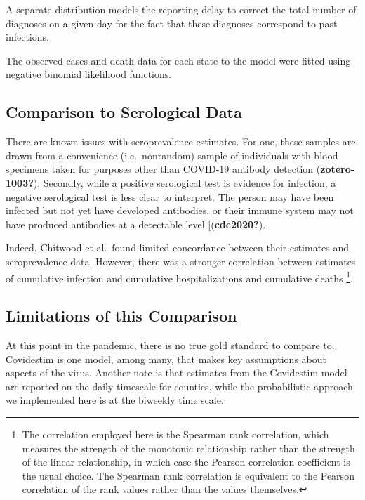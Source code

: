 \documentclass[12pt,twoside]{smiththesis}
\begin{document}
A separate distribution models the reporting delay to correct the total number of diagnoses on a given day for the fact that these diagnoses correspond to past infections.

The observed cases and death data for each state to the model were fitted using negative binomial likelihood functions.

\hypertarget{comparison-to-serological-data}{%
\subsection{Comparison to Serological Data}\label{comparison-to-serological-data}}

There are known issues with seroprevalence estimates. For one, these samples are drawn from a convenience (i.e.~nonrandom) sample of individuals with blood specimens taken for purposes other than COVID-19 antibody detection (\textbf{zotero-1003?}). Secondly, while a positive serological test is evidence for infection, a negative serological test is less clear to interpret. The person may have been infected but not yet have developed antibodies, or their immune system may not have produced antibodies at a detectable level {[}(\textbf{cdc2020?}).

Indeed, Chitwood et al.~found limited concordance between their estimates and seroprevalence data. However, there was a stronger correlation between estimates of cumulative infection and cumulative hospitalizations and cumulative deaths \footnote{The correlation employed here is the Spearman rank correlation, which measures the strength of the monotonic relationship rather than the strength of the linear relationship, in which case the Pearson correlation coefficient is the usual choice. The Spearman rank correlation is equivalent to the Pearson correlation of the rank values rather than the values themselves. }.

\hypertarget{limitations-of-this-comparison}{%
\subsection{Limitations of this Comparison}\label{limitations-of-this-comparison}}

At this point in the pandemic, there is no true gold standard to compare to. Covidestim is one model, among many, that makes key assumptions about aspects of the virus. Another note is that estimates from the Covidestim model are reported on the daily timescale for counties, while the probabilistic approach we implemented here is at the biweekly time scale.
\end{document}
